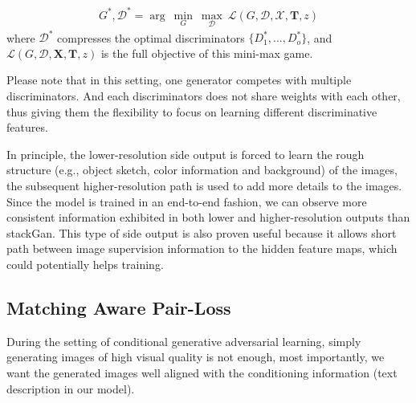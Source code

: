 \documentclass[10pt,twocolumn,letterpaper]{article}
\begin{document}
\begin{equation}
\label{equ:optim}
\begin{split}
  G^*, \mathcal{D}^* = \arg~\underset{G}{\min}\ \underset{\mathcal{D}}{\max}~ \mathcal{L}(G,\mathcal{D}, \mathcal{X}, \bm{T} , z)
\end{split}
\end{equation}
where $\mathcal{D}^*$ compresses the optimal discriminators $\{D_1^*, ..., D_o^*\}$, and $ \mathcal{L}(G,\mathcal{D}, \bm{X}, \bm{T} , z)$ is the full objective of this mini-max game.

Please note that in this setting, one generator competes with multiple discriminators. And each discriminators does not share weights with each other, thus giving them the flexibility to focus on learning different discriminative features.
 

In principle, the lower-resolution side output is forced to learn the rough structure (e.g., object sketch, color information and background) of the images, the subsequent higher-resolution path is used to add more details to the images. 
Since the model is trained in an end-to-end fashion, we can observe more consistent information exhibited in both lower and higher-resolution outputs than stackGan\cite{han2017stackgan}. This type of side output is also proven useful because it allows short path between image supervision information to the hidden feature maps, which could potentially helps training.


\subsection{Matching Aware Pair-Loss}
During the setting of conditional generative adversarial learning, simply generating images of high visual quality is not enough, most importantly, we want the generated images well aligned with the conditioning information (text description in our model).     

%
\end{document}
